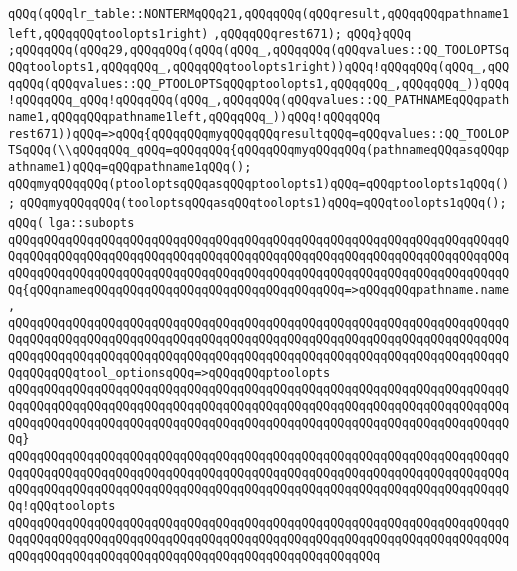 \verb|qQQq(qQQqlr_table::NONTERMqQQq21,qQQqqQQq(qQQqresult,qQQqqQQqpathname1left,qQQqqQQqtoolopts1right)|\newline
\verb|,qQQqqQQqrest671);|\newline
\verb|qQQq}qQQq|\newline
\verb|;qQQqqQQq(qQQq29,qQQqqQQq(qQQq(qQQq_,qQQqqQQq(qQQqvalues::QQ_TOOLOPTSqQQqtoolopts1,qQQqqQQq_,qQQqqQQqtoolopts1right))qQQq!qQQqqQQq(qQQq_,qQQqqQQq(qQQqvalues::QQ_PTOOLOPTSqQQqptoolopts1,qQQqqQQq_,qQQqqQQq_))qQQq!qQQqqQQq_qQQq!qQQqqQQq(qQQq_,qQQqqQQq(qQQqvalues::QQ_PATHNAMEqQQqpathname1,qQQqqQQqpathname1left,qQQqqQQq_))qQQq!qQQqqQQq|\newline
\verb|rest671))qQQq=>qQQq{qQQqqQQqmyqQQqqQQqresultqQQq=qQQqvalues::QQ_TOOLOPTSqQQq(\\qQQqqQQq_qQQq=qQQqqQQq{qQQqqQQqmyqQQqqQQq(pathnameqQQqasqQQqpathname1)qQQq=qQQqpathname1qQQq();|\newline
\verb|qQQqmyqQQqqQQq(ptooloptsqQQqasqQQqptoolopts1)qQQq=qQQqptoolopts1qQQq();|\newline
\verb|qQQqmyqQQqqQQq(tooloptsqQQqasqQQqtoolopts1)qQQq=qQQqtoolopts1qQQq();|\newline
\newline
\verb|qQQq(|\newline
\verb|lga::subopts|\newline
\verb|qQQqqQQqqQQqqQQqqQQqqQQqqQQqqQQqqQQqqQQqqQQqqQQqqQQqqQQqqQQqqQQqqQQqqQQqqQQqqQQqqQQqqQQqqQQqqQQqqQQqqQQqqQQqqQQqqQQqqQQqqQQqqQQqqQQqqQQqqQQqqQQqqQQqqQQqqQQqqQQqqQQqqQQqqQQqqQQqqQQqqQQqqQQqqQQqqQQqqQQqqQQqqQQqqQQq{qQQqnameqQQqqQQqqQQqqQQqqQQqqQQqqQQqqQQqqQQq=>qQQqqQQqpathname.name,|\newline
\verb|qQQqqQQqqQQqqQQqqQQqqQQqqQQqqQQqqQQqqQQqqQQqqQQqqQQqqQQqqQQqqQQqqQQqqQQqqQQqqQQqqQQqqQQqqQQqqQQqqQQqqQQqqQQqqQQqqQQqqQQqqQQqqQQqqQQqqQQqqQQqqQQqqQQqqQQqqQQqqQQqqQQqqQQqqQQqqQQqqQQqqQQqqQQqqQQqqQQqqQQqqQQqqQQqqQQqqQQqqQQqtool_optionsqQQq=>qQQqqQQqptoolopts|\newline
\verb|qQQqqQQqqQQqqQQqqQQqqQQqqQQqqQQqqQQqqQQqqQQqqQQqqQQqqQQqqQQqqQQqqQQqqQQqqQQqqQQqqQQqqQQqqQQqqQQqqQQqqQQqqQQqqQQqqQQqqQQqqQQqqQQqqQQqqQQqqQQqqQQqqQQqqQQqqQQqqQQqqQQqqQQqqQQqqQQqqQQqqQQqqQQqqQQqqQQqqQQqqQQqqQQqqQQq}|\newline
\verb|qQQqqQQqqQQqqQQqqQQqqQQqqQQqqQQqqQQqqQQqqQQqqQQqqQQqqQQqqQQqqQQqqQQqqQQqqQQqqQQqqQQqqQQqqQQqqQQqqQQqqQQqqQQqqQQqqQQqqQQqqQQqqQQqqQQqqQQqqQQqqQQqqQQqqQQqqQQqqQQqqQQqqQQqqQQqqQQqqQQqqQQqqQQqqQQqqQQqqQQqqQQqqQQqqQQq!qQQqtoolopts|\newline
\verb|qQQqqQQqqQQqqQQqqQQqqQQqqQQqqQQqqQQqqQQqqQQqqQQqqQQqqQQqqQQqqQQqqQQqqQQqqQQqqQQqqQQqqQQqqQQqqQQqqQQqqQQqqQQqqQQqqQQqqQQqqQQqqQQqqQQqqQQqqQQqqQQqqQQqqQQqqQQqqQQqqQQqqQQqqQQqqQQqqQQqqQQqqQQqqQQq|\newline
